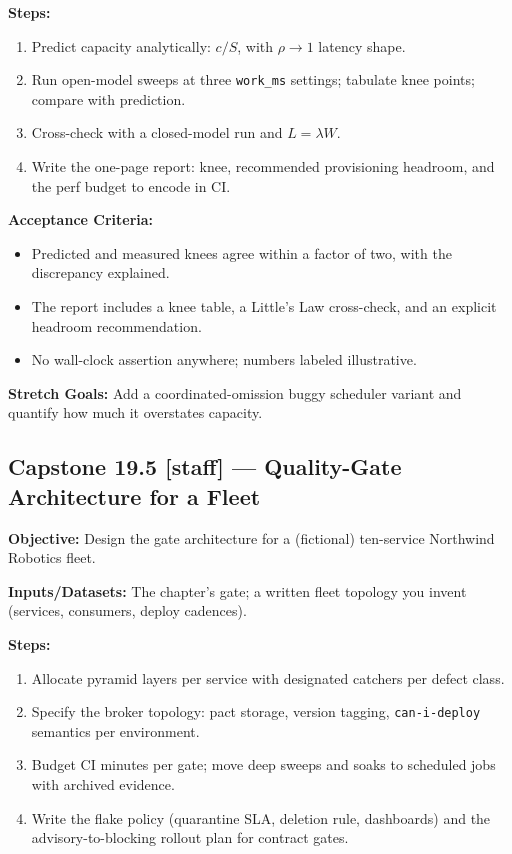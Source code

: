 \textbf{Steps:}
\begin{enumerate}
  \item Predict capacity analytically: $c/S$, with $\rho \to 1$ latency
        shape.
  \item Run open-model sweeps at three \texttt{work\_ms} settings; tabulate
        knee points; compare with prediction.
  \item Cross-check with a closed-model run and $L = \lambda W$.
  \item Write the one-page report: knee, recommended provisioning headroom,
        and the perf budget to encode in CI.
\end{enumerate}

\textbf{Acceptance Criteria:}
\begin{itemize}
  \item[$\square$] Predicted and measured knees agree within a factor of
        two, with the discrepancy explained.
  \item[$\square$] The report includes a knee table, a Little's Law
        cross-check, and an explicit headroom recommendation.
  \item[$\square$] No wall-clock assertion anywhere; numbers labeled
        illustrative.
\end{itemize}

\textbf{Stretch Goals:} Add a coordinated-omission buggy scheduler variant
and quantify how much it overstates capacity.

\subsection*{Capstone 19.5 [staff] --- Quality-Gate Architecture for a Fleet}
\textbf{Objective:} Design the gate architecture for a (fictional)
ten-service Northwind Robotics fleet.

\textbf{Inputs/Datasets:} The chapter's gate; a written fleet topology you
invent (services, consumers, deploy cadences).

\textbf{Steps:}
\begin{enumerate}
  \item Allocate pyramid layers per service with designated catchers per
        defect class.
  \item Specify the broker topology: pact storage, version tagging,
        \texttt{can-i-deploy} semantics per environment.
  \item Budget CI minutes per gate; move deep sweeps and soaks to
        scheduled jobs with archived evidence.
  \item Write the flake policy (quarantine SLA, deletion rule, dashboards)
        and the advisory-to-blocking rollout plan for contract gates.
\end{enumerate}

